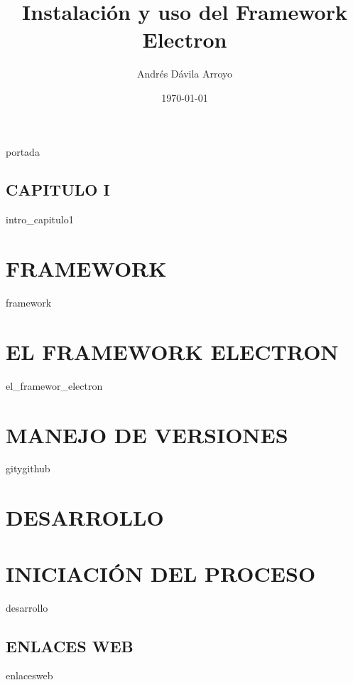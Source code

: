 \documentclass[12pt,titlepage,letterpaper]{article} %
\title{\textbf{Instalación y uso del Framework Electron} }
\author{Andrés Dávila Arroyo }
\date{\today}%
\begin{document}

{portada}
\tableofcontents %
\newpage
\listoffigures
\newpage

\begin{center}
\section*{\textbf{CAPITULO I}}
\end{center}
{intro_capitulo1}


\section{FRAMEWORK}
{framework}


\section{EL FRAMEWORK ELECTRON}
{el_framewor_electron}

\section{MANEJO DE VERSIONES}
{gitygithub}

\newpage
\begin{center}
\section*{\textbf{DESARROLLO}}
\section*{INICIACIÓN DEL PROCESO}
\end{center}
{desarrollo}


\newpage %
\begin{center}
\section*{\textbf{ENLACES WEB}}
\end{center}
{enlacesweb}

%

%


\end{document}
